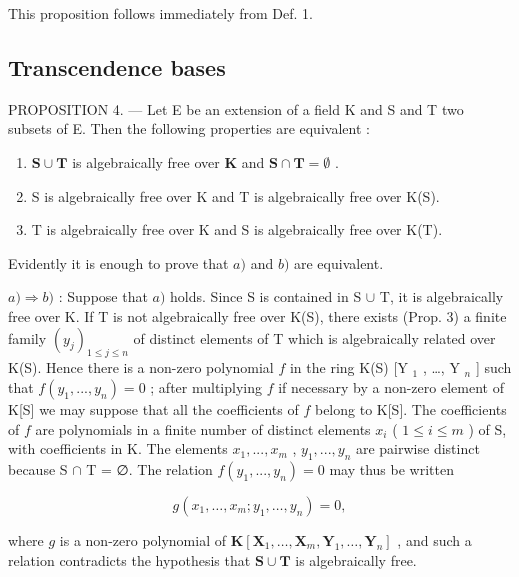 This proposition follows immediately from Def. 1.

\subsection{Transcendence bases}

PROPOSITION 4. --- Let E be an extension of a field K and S and T two subsets of E. Then the following properties are equivalent :

\begin{enumerate}
\def\labelenumi{\alph{enumi})}
\item
  \(\mathbf{S} \cup \mathbf{T}\) is algebraically free over \(\mathbf{K}\) and \(\mathbf{S} \cap \mathbf{T} = \emptyset\) .
\item
  S is algebraically free over K and T is algebraically free over K(S).
\item
  T is algebraically free over K and S is algebraically free over K(T).
\end{enumerate}

Evidently it is enough to prove that \(a)\) and \(b)\) are equivalent.

\(a) \Rightarrow b)\) : Suppose that \(a)\) holds. Since S is contained in S \(\cup\) T, it is algebraically free over K. If T is not algebraically free over K(S), there exists (Prop. 3) a finite family \((y_j)_{1 \leq j \leq n}\) of distinct elements of T which is algebraically related over K(S). Hence there is a non-zero polynomial \(f\) in the ring K(S) {[}Y \(_1\) , \ldots, Y \(_n\) {]} such that \(f(y_1, ..., y_n) = 0\) ; after multiplying \(f\) if necessary by a non-zero element of K{[}S{]} we may suppose that all the coefficients of \(f\) belong to K{[}S{]}. The coefficients of \(f\) are polynomials in a finite number of distinct elements \(x_i\) ( \(1 \leq i \leq m\) ) of S, with coefficients in K. The elements \(x_1, ..., x_m\) , \(y_1, ..., y_n\) are pairwise distinct because S \(\cap\) T = ∅. The relation \(f(y_1, ..., y_n) = 0\) may thus be written

\[
g \left(x _ {1}, \dots , x _ {m}; y _ {1}, \dots , y _ {n}\right) = 0,
\]

where \(g\) is a non-zero polynomial of \(\mathbf{K}[\mathbf{X}_1, \ldots, \mathbf{X}_m, \mathbf{Y}_1, \ldots, \mathbf{Y}_n]\) , and such a relation contradicts the hypothesis that \(\mathbf{S} \cup \mathbf{T}\) is algebraically free.

